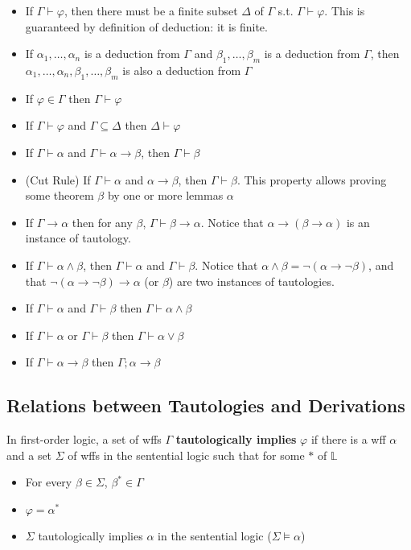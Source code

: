 \begin{itemize}
    \item If $\Gamma\vdash\varphi$, then there must be a finite subset $\Delta$ of $\Gamma$ s.t. $\Gamma\vdash\varphi$. This is guaranteed by definition of deduction: it is finite.
    \item If $\alpha_1,\dots,\alpha_n$ is a deduction from $\Gamma$ and $\beta_1,\dots,\beta_m$ is a deduction from $\Gamma$, then $\alpha_1,\dots,\alpha_n,\beta_1,\dots,\beta_m$ is also a deduction from $\Gamma$
    \item If $\varphi\in\Gamma$ then $\Gamma\vdash\varphi$
    \item If $\Gamma\vdash\varphi$ and $\Gamma\subseteq\Delta$ then $\Delta\vdash\varphi$
    \item If $\Gamma\vdash\alpha$ and $\Gamma\vdash\alpha\to\beta$, then $\Gamma\vdash\beta$
    \item (Cut Rule) If $\Gamma\vdash\alpha$ and $\alpha\to\beta$, then $\Gamma\vdash\beta$. This property allows proving some theorem $\beta$ by one or more lemmas $\alpha$
    \item If $\Gamma\to\alpha$ then for any $\beta$, $\Gamma\vdash\beta\to\alpha$. Notice that $\alpha\to\left( \beta\to\alpha \right)$ is an instance of tautology.
    \item If $\Gamma\vdash\alpha\wedge\beta$, then $\Gamma\vdash\alpha$ and $\Gamma\vdash\beta$. Notice that $\alpha\wedge\beta = \neg\left( \alpha\to\neg\beta \right)$, and that $\neg\left( \alpha\to\neg\beta \right) \to \alpha$ (or $\beta$) are two instances of tautologies.
    \item If $\Gamma\vdash\alpha$ and $\Gamma\vdash\beta$ then $\Gamma\vdash\alpha\wedge\beta$
    \item If $\Gamma\vdash\alpha$ or $\Gamma\vdash\beta$ then $\Gamma\vdash\alpha\vee\beta$
    \item If $\Gamma\vdash\alpha\to\beta$ then $\Gamma;\alpha\to\beta$
\end{itemize}

\subsection{Relations between Tautologies and Derivations}

\begin{definition}
    In first-order logic, a set of wffs $\Gamma$ \textbf{tautologically implies} $\varphi$ if there is a wff $\alpha$ and a set $\Sigma$ of wffs in the sentential logic such that for some $*$ of $\mathbb{L}$
    \begin{itemize}
        \item For every $\beta\in\Sigma$, $\beta^*\in\Gamma$
        \item $\varphi=\alpha^*$
        \item $\Sigma$ tautologically implies $\alpha$ in the sentential logic ($\Sigma\vDash\alpha$)
    \end{itemize}
\end{definition}

